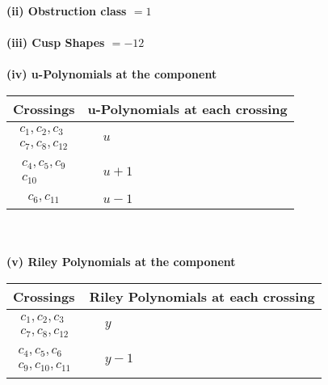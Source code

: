 \documentclass[1p]{elsarticle_modified}
\theoremstyle{definition}
\begin{document}
\flushleft \textbf{(ii) Obstruction class $= 1$}\\~\\
\flushleft \textbf{(iii) Cusp Shapes $= -12$}\\~\\
\newpage\renewcommand{\arraystretch}{1}
\flushleft \textbf{(iv) u-Polynomials at the component}\newline \\
\begin{tabular}{m{50pt}|m{274pt}}
Crossings & \hspace{64pt}u-Polynomials at each crossing \\
\hline $$\begin{aligned}c_{1},c_{2},c_{3}\\c_{7},c_{8},c_{12}\end{aligned}$$&$\begin{aligned}
&u
\end{aligned}$\\
\hline $$\begin{aligned}c_{4},c_{5},c_{9}\\c_{10}\end{aligned}$$&$\begin{aligned}
&u+1
\end{aligned}$\\
\hline $$\begin{aligned}c_{6},c_{11}\end{aligned}$$&$\begin{aligned}
&u-1
\end{aligned}$\\
\hline
\end{tabular}\\~\\
\newpage\renewcommand{\arraystretch}{1}
\flushleft \textbf{(v) Riley Polynomials at the component}\newline \\
\begin{tabular}{m{50pt}|m{274pt}}
Crossings & \hspace{64pt}Riley Polynomials at each crossing \\
\hline $$\begin{aligned}c_{1},c_{2},c_{3}\\c_{7},c_{8},c_{12}\end{aligned}$$&$\begin{aligned}
&y
\end{aligned}$\\
\hline $$\begin{aligned}c_{4},c_{5},c_{6}\\c_{9},c_{10},c_{11}\end{aligned}$$&$\begin{aligned}
&y-1
\end{aligned}$\\
\hline
\end{tabular}\\~\\
\end{document}
